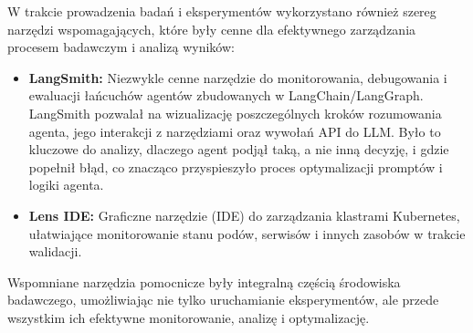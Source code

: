 W trakcie prowadzenia badań i eksperymentów wykorzystano również szereg narzędzi wspomagających, które były cenne dla efektywnego zarządzania procesem badawczym i analizą wyników:
\begin{itemize}
	\item \textbf{LangSmith:} \cite{langsmith} Niezwykle cenne narzędzie do monitorowania, debugowania i ewaluacji łańcuchów agentów zbudowanych w LangChain/LangGraph. LangSmith pozwalał na wizualizację poszczególnych kroków rozumowania agenta, jego interakcji z narzędziami oraz wywołań API do LLM. Było to kluczowe do analizy, dlaczego agent podjął taką, a nie inną decyzję, i gdzie popełnił błąd, co znacząco przyspieszyło proces optymalizacji promptów i logiki agenta.
	\item \textbf{Lens IDE:} \cite{lens_ide} Graficzne narzędzie (IDE) do zarządzania klastrami Kubernetes, ułatwiające monitorowanie stanu podów, serwisów i innych zasobów w trakcie walidacji.
\end{itemize}
Wspomniane narzędzia pomocnicze były integralną częścią środowiska badawczego, umożliwiając nie tylko uruchamianie eksperymentów, ale przede wszystkim ich efektywne monitorowanie, analizę i optymalizację.
